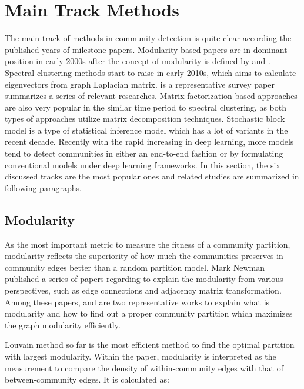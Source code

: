 \section{Main Track Methods}

The main track of methods in community detection is quite clear according the published years of milestone papers. Modularity based papers are in dominant position in early 2000s after the concept of modularity is defined by \cite{newman2004fast} and \cite{newman2006modularity}. Spectral clustering methods start to raise in early 2010s, which aims to calculate eigenvectors from graph Laplacian matrix. \cite{nascimento2011spectral} is a representative survey paper summarizes a series of relevant researches. Matrix factorization based approaches are also very popular in the similar time period to spectral clustering, as both types of approaches utilize matrix decomposition techniques. Stochastic block model is a type of statistical inference model which has a lot of variants in the recent decade. Recently with the rapid increasing in deep learning, more models tend to detect communities in either an end-to-end fashion or by formulating conventional models under deep learning frameworks. In this section, the six discussed tracks are the most popular ones and related studies are summarized in following paragraphs.

\subsection{Modularity}

As the most important metric to measure the fitness of a community partition, modularity reflects the superiority of how much the communities preserves in-community edges better than a random partition model. Mark Newman published a series of papers regarding to explain the modularity from various perspectives, such as edge connections and adjacency matrix transformation. Among these papers, \cite{blondel2008fast} and \cite{newman2006modularity} are two representative works to explain what is modularity and how to find out a proper community partition which maximizes the graph modularity efficiently. 

Louvain method \cite{blondel2008fast} so far is the most efficient method to find the optimal partition with largest modularity. Within the paper, modularity is interpreted as the measurement to compare the density of within-community edges with that of between-community edges. It is calculated as:

